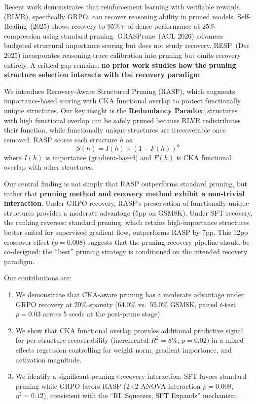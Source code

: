 \documentclass[11pt]{article}
\begin{document}
Recent work demonstrates that reinforcement learning with verifiable rewards (RLVR), specifically GRPO, can recover reasoning ability in pruned models. Self-Healing~(2025) shows recovery to 95\%+ of dense performance at 25\% compression using standard pruning. GRASPrune~(ACL 2026) advances budgeted structural importance scoring but does not study recovery. RESP~(Dec 2025) incorporates reasoning-trace calibration into pruning but omits recovery entirely. A critical gap remains: \textbf{no prior work studies how the pruning structure selection interacts with the recovery paradigm}.

We introduce Recovery-Aware Structured Pruning (RASP), which augments importance-based scoring with CKA functional overlap to protect functionally unique structures. Our key insight is the \textbf{Redundancy Paradox}: structures with high functional overlap can be safely pruned because RLVR redistributes their function, while functionally unique structures are irrecoverable once removed. RASP scores each structure $h$ as:
\begin{equation}
S(h) = I(h) \times (1 - F(h))^\alpha
\label{eq:rasp}
\end{equation}
where $I(h)$ is importance (gradient-based) and $F(h)$ is CKA functional overlap with other structures.

Our central finding is not simply that RASP outperforms standard pruning, but rather that \textbf{pruning method and recovery method exhibit a non-trivial interaction}. Under GRPO recovery, RASP's preservation of functionally unique structures provides a moderate advantage (5pp on GSM8K). Under SFT recovery, the ranking reverses: standard pruning, which retains high-importance structures better suited for supervised gradient flow, outperforms RASP by 7pp. This 12pp crossover effect ($p{=}0.008$) suggests that the pruning-recovery pipeline should be co-designed: the ``best'' pruning strategy is conditioned on the intended recovery paradigm.

Our contributions are:
\begin{enumerate}
\item We demonstrate that CKA-aware pruning has a moderate advantage under GRPO recovery at 20\% sparsity (64.0\% vs.\ 59.0\% GSM8K, paired $t$-test $p{=}0.03$ across 5 seeds at the post-prune stage).
\item We show that CKA functional overlap provides additional predictive signal for per-structure recoverability (incremental $R^2{=}8\%$, $p{=}0.02$) in a mixed-effects regression controlling for weight norm, gradient importance, and activation magnitude.
\item We identify a significant pruning$\times$recovery interaction: SFT favors standard pruning while GRPO favors RASP (2$\times$2 ANOVA interaction $p{=}0.008$, $\eta^2{=}0.12$), consistent with the ``RL Squeezes, SFT Expands'' mechanism.
\end{enumerate}
\end{document}
